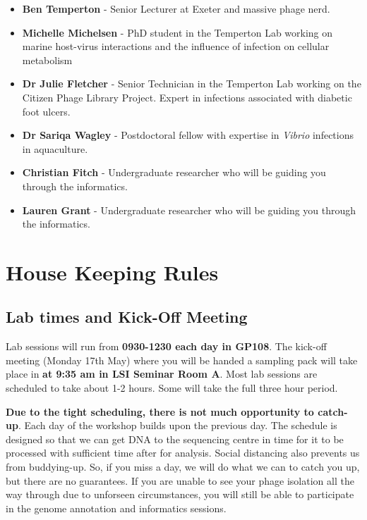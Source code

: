 \documentclass[
]{book}
\providecommand{\tightlist}{%
  \setlength{\itemsep}{0pt}\setlength{\parskip}{0pt}}
\begin{document}
\begin{itemize}
\tightlist
\item
  \textbf{Ben Temperton} - Senior Lecturer at Exeter and massive phage nerd.
\item
  \textbf{Michelle Michelsen} - PhD student in the Temperton Lab working on marine host-virus interactions and the influence of infection on cellular metabolism
\item
  \textbf{Dr Julie Fletcher} - Senior Technician in the Temperton Lab working on the Citizen Phage Library Project. Expert in infections associated with diabetic foot ulcers.
\item
  \textbf{Dr Sariqa Wagley} - Postdoctoral fellow with expertise in \emph{Vibrio} infections in aquaculture.
\item
  \textbf{Christian Fitch} - Undergraduate researcher who will be guiding you through the informatics.
\item
  \textbf{Lauren Grant} - Undergraduate researcher who will be guiding you through the informatics.
\end{itemize}

\hypertarget{house-keeping-rules}{%
\chapter*{House Keeping Rules}\label{house-keeping-rules}}

\hypertarget{lab-times-and-kick-off-meeting}{%
\section*{Lab times and Kick-Off Meeting}\label{lab-times-and-kick-off-meeting}}

Lab sessions will run from \textbf{0930-1230 each day in GP108}. The kick-off meeting (Monday 17th May) where you will be handed a sampling pack will take place in \textbf{at 9:35 am in LSI Seminar Room A}. Most lab sessions are scheduled to take about 1-2 hours. Some will take the full three hour period.

\textbf{Due to the tight scheduling, there is not much opportunity to catch-up}. Each day of the workshop builds upon the previous day. The schedule is designed so that we can get DNA to the sequencing centre in time for it to be processed with sufficient time after for analysis. Social distancing also prevents us from buddying-up. So, if you miss a day, we will do what we can to catch you up, but there are no guarantees. If you are unable to see your phage isolation all the way through due to unforseen circumstances, you will still be able to participate in the genome annotation and informatics sessions.
\end{document}

